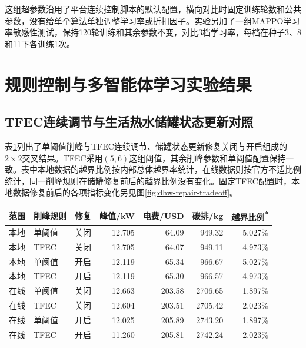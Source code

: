 这组超参数沿用了平台连续控制脚本的默认配置，横向对比时固定训练轮数和公共参数，没有给单个算法单独调整学习率或折扣因子。实验另加了一组MAPPO学习率敏感性测试，保持120轮训练和其余参数不变，对比3档学习率，每档在种子3、8和11下各训练1次。

\section{规则控制与多智能体学习实验结果}
\subsection{TFEC连续调节与生活热水储罐状态更新对照}
表\ref{tab:dhw-unlock}列出了单阈值削峰与TFEC连续调节、储罐状态更新修复关闭与开启组成的$2\times2$交叉结果。TFEC采用$(5,6)$这组阈值，其余削峰参数和单阈值配置保持一致。表中本地数据的越界比例按内部总体越界率统计，在线数据则按官方不适比例统计，同一削峰规则在储罐修复前后的越界比例没有变化。固定TFEC配置时，本地数据修复前后的各项指标变化另见图\ref{fig:dhw-repair-tradeoff}。

\begin{table}[!htbp]
\centering
{}
\label{tab:dhw-unlock}
\begin{tabular}{lllrrrr}
\toprule
范围 & 削峰规则 & 修复 & 峰值/kW & 电费/USD & 碳排/kg & 越界比例\textsuperscript{*} \\ \midrule
本地 & 单阈值 & 关闭 & 12.705 & 64.09 & 949.32 & 5.027\% \\
本地 & TFEC & 关闭 & 12.705 & 64.07 & 949.11 & 4.973\% \\
本地 & 单阈值 & 开启 & 12.119 & 65.34 & 966.67 & 5.027\% \\
本地 & TFEC & 开启 & 12.119 & 65.30 & 966.57 & 4.973\% \\ \midrule
在线 & 单阈值 & 关闭 & 12.663 & 203.58 & 2706.65 & 1.897\% \\
在线 & TFEC & 关闭 & 12.604 & 203.51 & 2705.42 & 2.023\% \\
在线 & 单阈值 & 开启 & 12.025 & 205.89 & 2743.20 & 1.897\% \\
在线 & TFEC & 开启 & 11.260 & 205.81 & 2742.24 & 2.023\% \\
\bottomrule
\end{tabular}
\par{}
\end{table}

